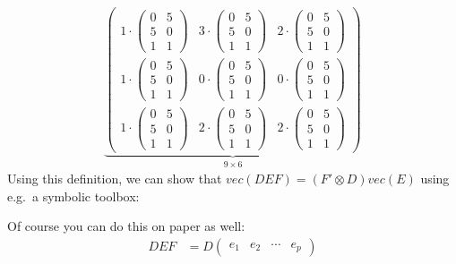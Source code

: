 \begin{enumerate}
\begin{align*}
    \underbrace{\begin{pmatrix} 1\cdot\begin{pmatrix}0&5\\5&0\\1&1 \end{pmatrix}&3\cdot\begin{pmatrix}0&5\\5&0\\1&1 \end{pmatrix}&2\cdot\begin{pmatrix}0&5\\5&0\\1&1 \end{pmatrix}\\1\cdot\begin{pmatrix}0&5\\5&0\\1&1 \end{pmatrix}&0\cdot\begin{pmatrix}0&5\\5&0\\1&1 \end{pmatrix}&0\cdot\begin{pmatrix}0&5\\5&0\\1&1 \end{pmatrix}\\1\cdot\begin{pmatrix}0&5\\5&0\\1&1 \end{pmatrix}&2\cdot\begin{pmatrix}0&5\\5&0\\1&1 \end{pmatrix}&2\cdot\begin{pmatrix}0&5\\5&0\\1&1 \end{pmatrix}  \end{pmatrix}}_{9\times6}
\end{align*}
Using this definition, we can show that \(vec(DEF) = (F' \otimes D) vec(E)\) using e.g.\ a symbolic toolbox:

Of course you can do this on paper as well:		 
\begin{align*}
DEF &= D \begin{pmatrix} e_1 & e_2 & \cdots & e_p \end{pmatrix}

\end{align*}
\end{enumerate}
